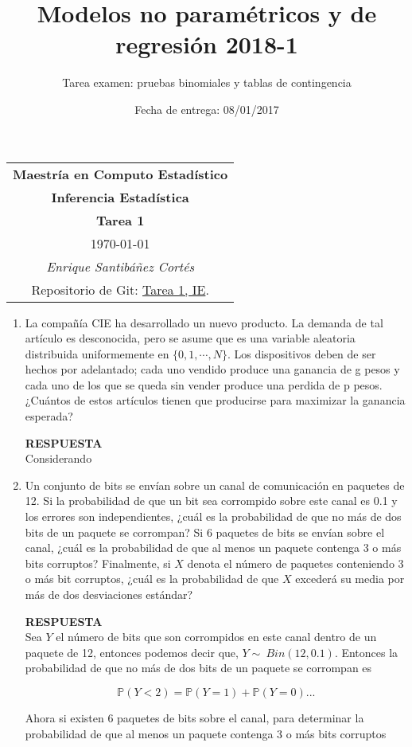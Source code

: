 \documentclass[11pt,letterpaper]{article}
\title{Modelos no paramétricos y de regresión 2018-1}
\author{Tarea examen: pruebas binomiales y tablas de contingencia}
\date{Fecha de entrega: 08/01/2017}
\newcommand{\mP}{\mathbb{P}}
\newcommand{\res}{\textbf{RESPUESTA}\\}
\begin{document}
\begin{table}[ht]
\centering
\begin{tabular}{c}
\textbf{Maestría en Computo Estadístico}\\
\textbf{Inferencia Estadística} \\
\textbf{Tarea 1}\\
\today \\
\emph{Enrique Santibáñez Cortés}\\
Repositorio de Git: \href{https://github.com/Enriquesec/Inferencia_Estad-stica/tree/master/Tareas/Tarea_1}{Tarea 1, IE}.
\end{tabular}
\end{table}

\begin{enumerate}

\item La compañía CIE ha desarrollado un nuevo producto. La demanda de tal artículo es desconocida, pero se asume que es una variable aleatoria distribuida uniformemente en $\{0, 1, \cdots, N \}$.
Los dispositivos deben de ser hechos por adelantado; cada uno vendido produce una ganancia de g pesos y cada uno de los que se queda sin vender produce una perdida de p pesos.
¿Cuántos de estos artículos tienen que producirse para maximizar la ganancia esperada?

\res

Considerando

\item Un conjunto de bits se envían sobre un canal de comunicación en paquetes de 12. Si la probabilidad de que un bit sea corrompido sobre este canal es 0.1 y los errores son independientes,
¿cuál es la probabilidad de que no más de dos bits de un paquete se corrompan? Si 6 paquetes
de bits se envían sobre el canal, ¿cuál es la probabilidad de que al menos un paquete contenga 3 o más bits corruptos? Finalmente, si $X$ denota el número de paquetes conteniendo 3 o más bit corruptos, ¿cuál es la probabilidad de que $X$ excederá su media por más de dos desviaciones estándar? 

\res

Sea $Y$ el número de bits que son corrompidos en este canal dentro de un paquete de 12, entonces podemos decir que, $Y\sim \ Bin(12,0.1)$. Entonces la probabilidad de que no más de dos bits de un paquete se corrompan es

$$\mP(Y<2)= \mP(Y=1)+\mP(Y=0)...$$

Ahora si existen 6 paquetes de bits sobre el canal, para determinar la probabilidad de que al menos un paquete contenga 3 o más bits corruptos


\end{enumerate}
\end{document}
